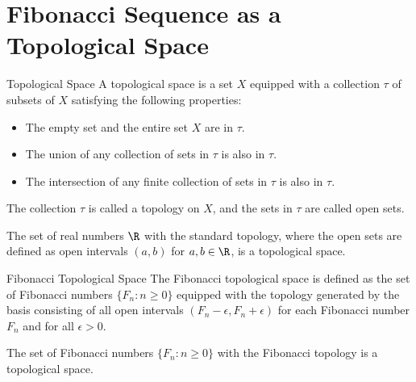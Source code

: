 \documentclass[openany]{book}
\begin{document}
\section{Fibonacci Sequence as a Topological Space}
\begin{mydefinition}{Topological Space}
    A topological space is a set $X$ equipped with a collection $\tau$ of subsets of $X$ satisfying the following properties:
    \begin{itemize}
        \item The empty set and the entire set $X$ are in $\tau$.
        \item The union of any collection of sets in $\tau$ is also in $\tau$.
        \item The intersection of any finite collection of sets in $\tau$ is also in $\tau$.
    \end{itemize}
    The collection $\tau$ is called a topology on $X$, and the sets in $\tau$ are called open sets.
\end{mydefinition}
\begin{example}
    The set of real numbers $\R$ with the standard topology, where the open sets are defined as open intervals $(a, b)$ for $a, b \in \R$, is a topological space.
\end{example}
\begin{mydefinition}{Fibonacci Topological Space}
    The Fibonacci topological space is defined as the set of Fibonacci numbers $\{F_n : n \geq 0\}$ equipped with the topology generated by the basis consisting of all open intervals $(F_n - \epsilon, F_n + \epsilon)$ for each Fibonacci number $F_n$ and for all $\epsilon > 0$.
\end{mydefinition}
\begin{mytheorem}
    The set of Fibonacci numbers $\{F_n : n \geq 0\}$ with the Fibonacci topology is a topological space.
\end{mytheorem}
\end{document}
